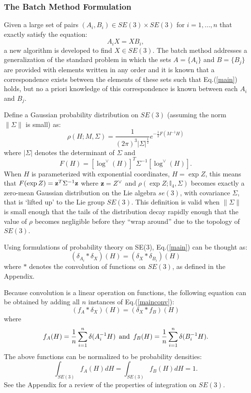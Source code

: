 \documentclass[twocolumn,10pt]{asme2ej}
\newcommand{\half}{\frac{1}{2}}
\begin{document}
\subsubsection{The Batch Method Formulation}
Given a large set of pairs $(A_i,B_i) \in SE(3) \times SE(3)$ for $i =1,...,n$ that exactly satisfy the equation:
\begin{equation} A_i X = X B_i , \label{main} \end{equation}
a new algorithm is developed to find $X \in SE(3)$. The batch method addresses a generalization of the standard problem in which
the sets $A=\{A_i\}$ and $B =\{B_j\}$ are provided with elements written in any order and it is known that a correspondence exists between the elements of these sets such that Eq.(\ref{main}) holds, but no a priori knowledge of this correspondence is known between each $A_i$ and $B_j$.

Define a Gaussian probability distribution on $SE(3)$ (assuming the norm $\|\Sigma\|$ is small) as:
$$ \rho(H; M, \Sigma) = \frac{1}{(2\pi)^3 |\Sigma|^{\half}} e^{-\half F(M^{-1} H)} $$
where $|\Sigma|$ denotes the determinant of $\Sigma$ and
$$ F(H) = [\log^{\vee}(H)]^T \Sigma^{-1} [\log^{\vee}(H)]. $$
When $H$ is parameterized with exponential coordinates, $H = \exp Z$, this means that
$F(\exp Z) = {\bf z}^T \Sigma^{-1}  {\bf z}$ where ${\bf z} = Z^{\vee}$ and
$\rho(\exp Z; \mathbb{I}_4, \Sigma)$ becomes exactly a zero-mean Gaussian distribution on the Lie algebra $se(3)$, with covariance $\Sigma$, that is `lifted up' to the Lie group $SE(3)$. This definition is valid when $\|\Sigma\|$ is small enough that the tails of the distribution decay rapidly enough that the value of $\rho$
becomes negligible before they ``wrap around'' due to the topology of $SE(3)$. 

Using formulations of probability theory on SE(3), Eq.(\ref{main}) can be thought as:
\begin{equation} (\delta_{A_i} * \delta_X)(H) = (\delta_X * \delta_{B_i})(H) \label{mainconv} \end{equation}
where $*$ denotes the convolution of functions on $SE(3)$, as defined in the Appendix.

Because convolution is a linear operation on functions, the following equation can be obtained by adding all $n$ instances of Eq.(\ref{mainconv}):
\begin{equation} (f_A * \delta_X)(H) = (\delta_X * f_B)(H) \label{mainconvall} \end{equation}
where $$ f_A(H) = \frac{1}{n} \sum_{i=1}^{n} \delta(A_i^{-1} H) \,\,\, {\rm and} \,\,\, f_B(H) = \frac{1}{n} \sum_{i=1}^{n} \delta(B_i^{-1} H). $$
The above functions can be normalized
to be probability densities:
$$ \int_{SE(3)} f_A(H) dH = \int_{SE(3)} f_B(H) dH = 1. $$
See the Appendix for a review of the properties of integration on $SE(3)$.
\end{document}
